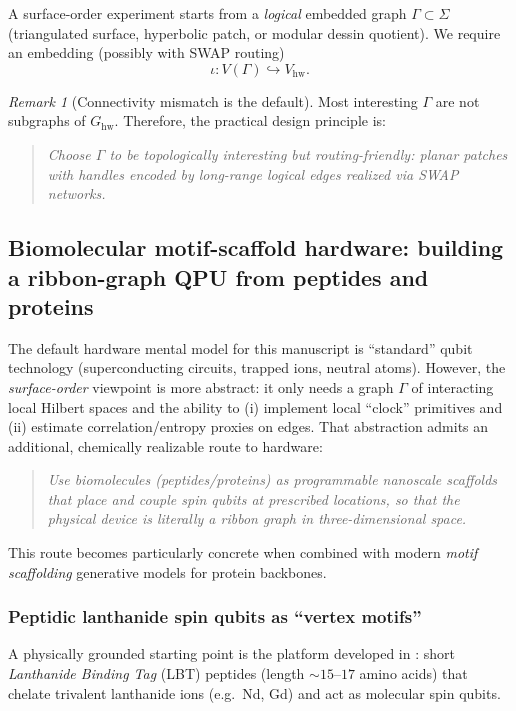 \documentclass[11pt,oneside]{amsbook}
\numberwithin{equation}{section}
\theoremstyle{plain}
\theoremstyle{definition}
\theoremstyle{remark}
\newtheorem{remark}[theorem]{Remark}
\begin{document}
A surface-order experiment starts from a \emph{logical} embedded graph $\Gamma\subset \Sigma$ (triangulated surface, hyperbolic patch, or modular dessin quotient).
We require an embedding (possibly with SWAP routing)
\[
\iota:V(\Gamma)\hookrightarrow V_{\mathrm{hw}}.
\]

\begin{remark}[Connectivity mismatch is the default]
Most interesting $\Gamma$ are not subgraphs of $G_{\mathrm{hw}}$.
Therefore, the practical design principle is:
\begin{quote}
\emph{Choose $\Gamma$ to be topologically interesting but routing-friendly: planar patches with handles encoded by long-range logical edges realized via SWAP networks.}
\end{quote}
\end{remark}


\subsection{Biomolecular motif-scaffold hardware: building a ribbon-graph QPU from peptides and proteins}
\label{sec:biomolecular_qpu}

The default hardware mental model for this manuscript is ``standard'' qubit technology (superconducting circuits, trapped ions, neutral atoms).
However, the \emph{surface-order} viewpoint is more abstract: it only needs a graph $\Gamma$ of interacting local Hilbert spaces and the ability to
(i) implement local ``clock'' primitives and (ii) estimate correlation/entropy proxies on edges.
That abstraction admits an additional, chemically realizable route to hardware:

\begin{quote}
\emph{Use biomolecules (peptides/proteins) as programmable nanoscale scaffolds that place and couple spin qubits at prescribed locations,
so that the physical device \emph{is literally} a ribbon graph in three-dimensional space.}
\end{quote}

This route becomes particularly concrete when combined with modern \emph{motif scaffolding} generative models for protein backbones.

\subsubsection{Peptidic lanthanide spin qubits as ``vertex motifs''}
A physically grounded starting point is the platform developed in \cite{Rosaleny2017PeptideQC}:
short \emph{Lanthanide Binding Tag} (LBT) peptides (length $\sim 15$--$17$ amino acids) that chelate trivalent lanthanide ions (e.g.\ Nd, Gd) and act as molecular spin qubits.
\end{document}
